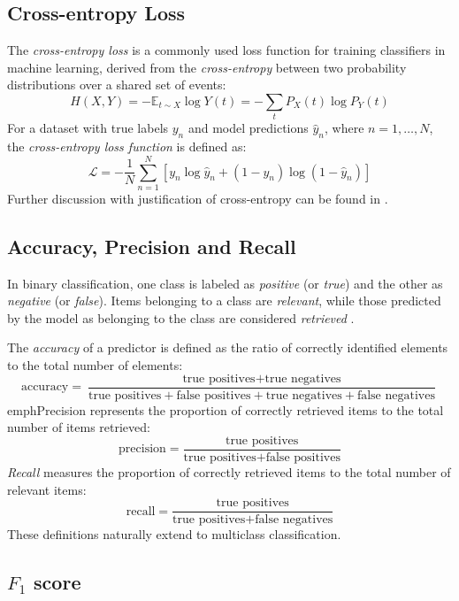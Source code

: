 \subsection{Cross-entropy Loss}

The \emph{cross-entropy loss} is a commonly used loss function for training classifiers in machine learning, derived from the \emph{cross-entropy} between two probability distributions over a shared set of events: \[H(X, Y) = -\mathbb{E}_{t\sim X}\log Y(t) = -\sum_t P_X(t)\log P_Y(t)\] For a dataset with true labels $y_n$ and model predictions $\hat{y}_n$, where $n=1,\ldots,N$, the \emph{cross-entropy loss function} is defined as: \[\mathcal{L} = -\frac{1}{N}\sum_{n=1}^N\left[y_n\log \hat{y}_n + (1 - y_n)\log(1 - \hat{y}_n)\right]\] Further discussion with justification of cross-entropy can be found in \cite[p. 73--75, 178]{Goodfellow2016}.

\subsection{Accuracy, Precision and Recall}

In binary classification, one class is labeled as \emph{positive} (or \emph{true}) and the other as \emph{negative} (or \emph{false}). Items belonging to a class are \emph{relevant}, while those predicted by the model as belonging to the class are considered \emph{retrieved} \cite[p. 76]{Roelleke2022}.

The \emph{accuracy} of a predictor is defined as the ratio of correctly identified elements to the total number of elements: \[\textrm{accuracy} = \frac{\textrm{true positives} + \textrm{true negatives}}{\textrm{true positives} + \textrm{false positives} +\textrm{true negatives} + \textrm{false negatives}}\] emph{Precision} represents the proportion of correctly retrieved items to the total number of items retrieved: \[\textrm{precision} = \frac{\textrm{true positives}}{\textrm{true positives} + \textrm{false positives}}\] \emph{Recall} measures the proportion of correctly retrieved items to the total number of relevant items: \[\textrm{recall} = \frac{\textrm{true positives}}{\textrm{true positives} + \textrm{false negatives}}\] These definitions naturally extend to multiclass classification.

\subsection{$F_1$ score}


